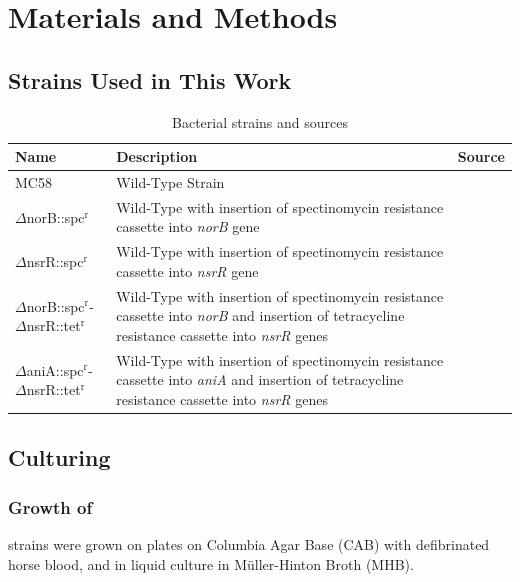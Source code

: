 \chapter{Materials and Methods}
\label{chap:matandmeth}
\section{\Nsm{} Strains Used in This Work}
\begin{table}[h]
\begin{center}
\begin{tabular}{>{\centering}m{4.4cm}m{6.4cm}>{\centering}m{3.1cm}}
\toprule
\textbf{Name} & \centering \textbf{Description} & \textbf{Source}
\tabularnewline
\midrule
MC58 & Wild-Type Strain & \citet{McGuinness1990}
\tabularnewline\noalign{\smallskip}\hline\noalign{\smallskip}
$\Delta$norB::spc$^\textrm{r}$\nomenclature{spc$^\textrm{r}$}{Spectinomycin resistance} & Wild-Type with insertion of spectinomycin resistance cassette into \textit{norB} gene & \citet{Heurlier2008}
\tabularnewline\noalign{\smallskip}\hline\noalign{\smallskip}
$\Delta$nsrR::spc$^\textrm{r}$ & Wild-Type with insertion of spectinomycin resistance cassette into \textit{nsrR} gene & \citet{Rock2007}
\tabularnewline\noalign{\smallskip}\hline\noalign{\smallskip}
$\Delta$norB::spc$^\textrm{r}$-$\Delta$nsrR::tet$^\textrm{r}$\nomenclature{tet$^\textrm{r}$}{tetracycline resistance} & Wild-Type with insertion of spectinomycin resistance cassette into \textit{norB} and insertion of tetracycline resistance cassette into \textit{nsrR} genes & \citet{Heurlier2008}
\tabularnewline\noalign{\smallskip}\hline\noalign{\smallskip}
$\Delta$aniA::spc$^\textrm{r}$-$\Delta$nsrR::tet$^\textrm{r}$ & Wild-Type with insertion of spectinomycin resistance cassette into \textit{aniA} and insertion of tetracycline resistance cassette into \textit{nsrR} genes & \citet{Heurlier2008}
\tabularnewline
\bottomrule
\end{tabular} 
\end{center}
\caption{Bacterial strains and sources
\label{tab:bacterial-strains}}
\end{table}

\section{Culturing \Nsm{}}
\subsection{Growth of \Nsm{}}
\Nm{} strains were grown on plates on Columbia Agar Base (CAB) with defibrinated horse blood, and in liquid culture in M\"uller-Hinton Broth (MHB).

